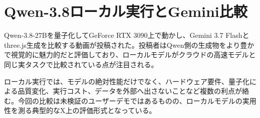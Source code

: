 \section{Qwen-3.8ローカル実行とGemini比較}

Qwen-3.8-27Bを量子化してGeForce RTX 3090上で動かし、Gemini 3.7 Flashとthree.js生成を比較する動画が投稿された。投稿者はQwen側の生成物をより豊かで視覚的に魅力的だと評価しており、ローカルモデルがクラウドの高速モデルと同じ実タスクで比較されている点が注目される。

ローカル実行では、モデルの絶対性能だけでなく、ハードウェア要件、量子化による品質変化、実行コスト、データを外部へ出さないことなど複数の利点が絡む。今回の比較は未検証のユーザーデモではあるものの、ローカルモデルの実用性を測る典型的なX上の評価形式となっている。
